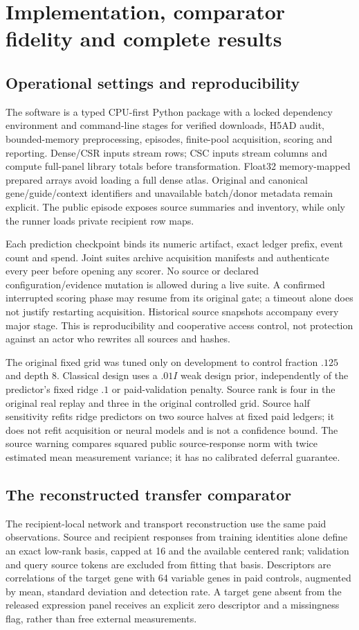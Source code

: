 \section{Implementation, comparator fidelity and complete results}
\label{app:implementation}
\subsection{Operational settings and reproducibility}
The software is a typed CPU-first Python package with a locked dependency environment and command-line stages for verified downloads, H5AD audit, bounded-memory preprocessing, episodes, finite-pool acquisition, scoring and reporting. Dense/CSR inputs stream rows; CSC inputs stream columns and compute full-panel library totals before transformation. Float32 memory-mapped prepared arrays avoid loading a full dense atlas. Original and canonical gene/guide/context identifiers and unavailable batch/donor metadata remain explicit. The public episode exposes source summaries and inventory, while only the runner loads private recipient row maps.

Each prediction checkpoint binds its numeric artifact, exact ledger prefix, event count and spend. Joint suites archive acquisition manifests and authenticate every peer before opening any scorer. No source or declared configuration/evidence mutation is allowed during a live suite. A confirmed interrupted scoring phase may resume from its original gate; a timeout alone does not justify restarting acquisition. Historical source snapshots accompany every major stage. This is reproducibility and cooperative access control, not protection against an actor who rewrites all sources and hashes.

The original fixed grid was tuned only on development to control fraction $.125$ and depth 8. Classical design uses a $.01I$ weak design prior, independently of the predictor's fixed ridge $.1$ or paid-validation penalty. Source rank is four in the original real replay and three in the original controlled grid. Source half sensitivity refits ridge predictors on two source halves at fixed paid ledgers; it does not refit acquisition or neural models and is not a confidence bound. The source warning compares squared public source-response norm with twice estimated mean measurement variance; it has no calibrated deferral guarantee.

\subsection{The reconstructed transfer comparator}
The recipient-local network and transport reconstruction use the same paid observations. Source and recipient responses from training identities alone define an exact low-rank basis, capped at 16 and the available centered rank; validation and query source tokens are excluded from fitting that basis. Descriptors are correlations of the target gene with 64 variable genes in paid controls, augmented by mean, standard deviation and detection rate. A target gene absent from the released expression panel receives an explicit zero descriptor and a missingness flag, rather than free external measurements.

